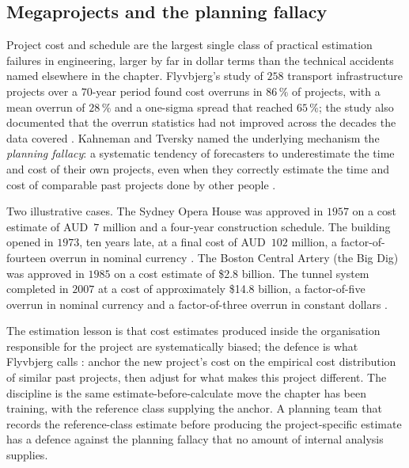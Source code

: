 \subsection{Megaprojects and the planning fallacy}

Project cost and schedule are the largest single class of practical
estimation failures in engineering, larger by far in dollar terms
than the technical accidents named elsewhere in the chapter.
Flyvbjerg's study of $258$ transport infrastructure projects over a
$70$-year period found cost overruns in $86\,\%$ of projects, with a
mean overrun of $28\,\%$ and a one-sigma spread that reached
$65\,\%$; the study also documented that the overrun statistics had
not improved across the decades the data covered
\cite{paper:ch09-flyvbjerg-cost-overrun-2002,text:ch09-flyvbjerg-megaprojects-2003}.
Kahneman and Tversky named the underlying mechanism the
\emph{planning fallacy}: a systematic tendency of forecasters to
underestimate the time and cost of their own projects, even when
they correctly estimate the time and cost of comparable past
projects done by other people
\cite{paper:ch09-kahneman-thinking-1979}.

Two illustrative cases. The Sydney Opera House was approved in
$1957$ on a cost estimate of AUD~$7$ million and a four-year
construction schedule. The building opened in $1973$, ten years
late, at a final cost of AUD~$102$ million, a factor-of-fourteen
overrun in nominal currency \cite{paper:ch09-bia-1972-sydney}. The
Boston Central Artery (the Big Dig) was approved in $1985$ on a
cost estimate of \$2.8 billion. The tunnel system completed in
$2007$ at a cost of approximately \$14.8 billion, a factor-of-five
overrun in nominal currency and a factor-of-three overrun in
constant dollars \cite{text:ch09-flyvbjerg-megaprojects-2003}.

The estimation lesson is that cost estimates produced inside the
organisation responsible for the project are systematically
biased; the defence is what Flyvbjerg calls : anchor the new project's cost on the empirical
cost distribution of similar past projects, then adjust for what
makes this project different. The discipline is the same
estimate-before-calculate move the chapter has been training, with
the reference class supplying the anchor. A planning team that
records the reference-class estimate before producing the
project-specific estimate has a defence against the planning
fallacy that no amount of internal analysis supplies.

